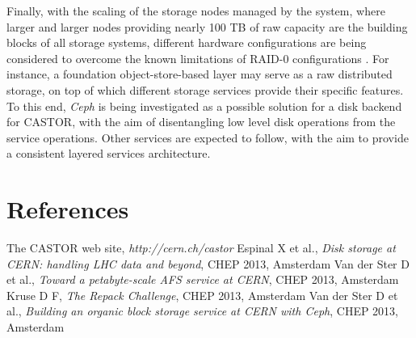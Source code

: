 \documentclass[a4paper]{jpconf}
\begin{document}
Finally, with the scaling of the storage nodes managed by the system, where larger and larger nodes providing nearly 100 TB of raw capacity are the building blocks of all storage systems, different hardware configurations are being considered to overcome the known limitations of RAID-0 configurations \cite{dss}. For instance, a foundation object-store-based layer may serve as a raw distributed storage, on top of which different storage services provide their specific features. To this end, \textit{Ceph} \cite{ceph} is being investigated as a possible solution for a disk backend for CASTOR, with the aim of disentangling low level disk operations from the service operations. Other services are expected to follow, with the aim to provide a consistent layered services architecture.


\section*{References}

\begin{thebibliography}{5}
 The CASTOR web site, \textit{http://cern.ch/castor}
 Espinal X et al., \textit{Disk storage at CERN: handling LHC data and beyond}, CHEP 2013, Amsterdam
 Van der Ster D et al., \textit{Toward a petabyte-scale AFS service at CERN}, CHEP 2013, Amsterdam
 Kruse D F, \textit{The Repack Challenge}, CHEP 2013, Amsterdam
 Van der Ster D et al., \textit{Building an organic block storage service at CERN with Ceph}, CHEP 2013, Amsterdam
\end{thebibliography}
\end{document}
